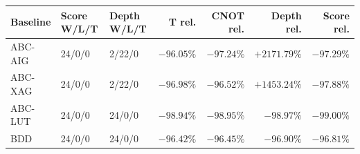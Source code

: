 \begin{tabular}{lllrrrr}
\toprule
Baseline & Score W/L/T & Depth W/L/T & T rel. & CNOT rel. & Depth rel. & Score rel. \\
\midrule
ABC-AIG & 24/0/0 & 2/22/0 & $-96.05\%$ & $-97.24\%$ & $+2171.79\%$ & $-97.29\%$ \\
ABC-XAG & 24/0/0 & 2/22/0 & $-96.98\%$ & $-96.52\%$ & $+1453.24\%$ & $-97.88\%$ \\
ABC-LUT & 24/0/0 & 24/0/0 & $-98.94\%$ & $-98.95\%$ & $-98.97\%$ & $-99.00\%$ \\
BDD & 24/0/0 & 24/0/0 & $-96.42\%$ & $-96.45\%$ & $-96.90\%$ & $-96.81\%$ \\
\bottomrule
\end{tabular}
